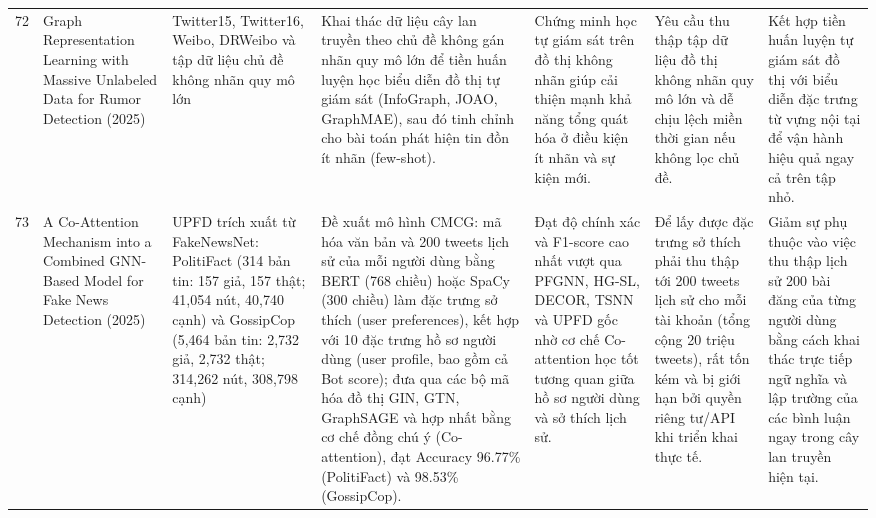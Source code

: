 \documentclass[11pt,a4paper]{extreport}
\begin{document}
\begin{landscape}
\begin{longtable}{@{}C{0.6cm}p{3.6cm}p{2.7cm}p{4.8cm}p{3.6cm}p{3.6cm}p{3.6cm}@{}}
72 & Graph Representation Learning with Massive Unlabeled Data for Rumor Detection (2025) \cite{cui_graph_2025} & Twitter15, Twitter16, Weibo, DRWeibo và tập dữ liệu chủ đề không nhãn quy mô lớn & Khai thác dữ liệu cây lan truyền theo chủ đề không gán nhãn quy mô lớn để tiền huấn luyện học biểu diễn đồ thị tự giám sát (InfoGraph, JOAO, GraphMAE), sau đó tinh chỉnh cho bài toán phát hiện tin đồn ít nhãn (few-shot). & Chứng minh học tự giám sát trên đồ thị không nhãn giúp cải thiện mạnh khả năng tổng quát hóa ở điều kiện ít nhãn và sự kiện mới. & Yêu cầu thu thập tập dữ liệu đồ thị không nhãn quy mô lớn và dễ chịu lệch miền thời gian nếu không lọc chủ đề. & Kết hợp tiền huấn luyện tự giám sát đồ thị với biểu diễn đặc trưng từ vựng nội tại để vận hành hiệu quả ngay cả trên tập nhỏ. \\ 

73 & A Co-Attention Mechanism into a Combined GNN-Based Model for Fake News Detection (2025) \cite{noauthor_co-attention_2025} & UPFD trích xuất từ FakeNewsNet: PolitiFact (314 bản tin: 157 giả, 157 thật; 41,054 nút, 40,740 cạnh) và GossipCop (5,464 bản tin: 2,732 giả, 2,732 thật; 314,262 nút, 308,798 cạnh) & Đề xuất mô hình CMCG: mã hóa văn bản và 200 tweets lịch sử của mỗi người dùng bằng BERT (768 chiều) hoặc SpaCy (300 chiều) làm đặc trưng sở thích (user preferences), kết hợp với 10 đặc trưng hồ sơ người dùng (user profile, bao gồm cả Bot score); đưa qua các bộ mã hóa đồ thị GIN, GTN, GraphSAGE và hợp nhất bằng cơ chế đồng chú ý (Co-attention), đạt Accuracy 96.77\% (PolitiFact) và 98.53\% (GossipCop). & Đạt độ chính xác và F1-score cao nhất vượt qua PFGNN, HG-SL, DECOR, TSNN và UPFD gốc nhờ cơ chế Co-attention học tốt tương quan giữa hồ sơ người dùng và sở thích lịch sử. & Để lấy được đặc trưng sở thích phải thu thập tới 200 tweets lịch sử cho mỗi tài khoản (tổng cộng 20 triệu tweets), rất tốn kém và bị giới hạn bởi quyền riêng tư/API khi triển khai thực tế. & Giảm sự phụ thuộc vào việc thu thập lịch sử 200 bài đăng của từng người dùng bằng cách khai thác trực tiếp ngữ nghĩa và lập trường của các bình luận ngay trong cây lan truyền hiện tại. \\ 


\end{longtable}
\end{landscape}
\end{document}
